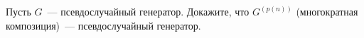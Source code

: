 Пусть $G$~--- псевдослучайный генератор. Докажите, что $G^{(p(n))}$ (многократная композиция)~---
псевдослучайный генератор.
